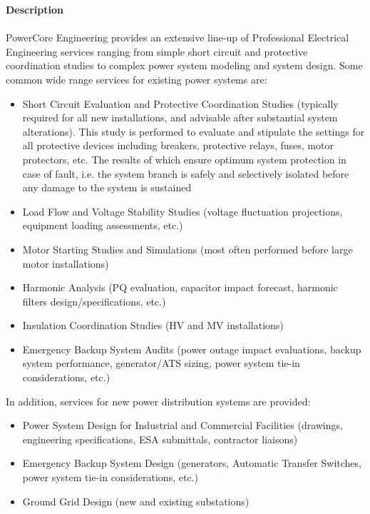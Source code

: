 \textbf{Description}\\
\\
PowerCore Engineering provides an extensive line-up of Professional Electrical Engineering services ranging from simple short circuit and protective coordination studies to complex power system modeling and system design. Some common wide range services for existing power systems are:
\begin{itemize}
	\item Short Circuit Evaluation and Protective Coordination Studies (typically required for all new installations, and advisable after substantial system alterations). This study is performed to evaluate and stipulate the settings for all protective devices including breakers, protective relays, fuses, motor protectors, etc. The results of which ensure optimum system protection in case of fault, i.e. the system branch is safely and selectively isolated before any damage to the system is sustained
	\item Load Flow and Voltage Stability Studies (voltage fluctuation projections, equipment loading assessments, etc.)
	\item Motor Starting Studies and Simulations (most often performed before large motor installations)
	\item Harmonic Analysis (PQ evaluation, capacitor impact forecast, harmonic filters design/specifications, etc.)
	\item Insulation Coordination Studies (HV and MV installations)
	\item Emergency Backup System Audits (power outage impact evaluations, backup system performance, generator/ATS sizing, power system tie-in considerations, etc.)
\end{itemize}


In addition, services for new power distribution systems are provided:
\begin{itemize}
	\item Power System Design for Industrial and Commercial Facilities (drawings, engineering specifications, ESA submittals, contractor liaisons)
	\item Emergency Backup System Design (generators, Automatic Transfer Switches, power system tie-in considerations, etc.)
	\item Ground Grid Design (new and existing substations)
\end{itemize}

